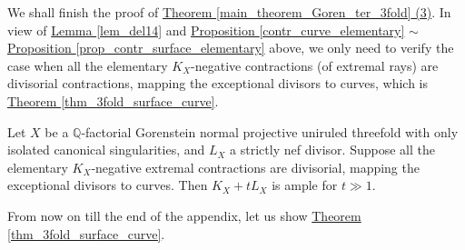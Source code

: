\begin{rmq}\label{remark_conclude_excep_tocurve}
We shall finish the proof of  {\hyperref[main_theorem_Goren_ter_3fold]{Theorem   \ref*{main_theorem_Goren_ter_3fold} (3)}}.  %
In view of {\hyperref[lem_del14]{Lemma  \ref*{lem_del14}}} and {\hyperref[contr_curve_elementary]{Proposition   \ref*{contr_curve_elementary}}}  $\sim$ {\hyperref[prop_contr_surface_elementary]{Proposition   \ref*{prop_contr_surface_elementary}}}  above,  we only need to verify the case when all the elementary $K_X$-negative  contractions (of extremal rays) are divisorial contractions, mapping the exceptional divisors to curves, %
which is {\hyperref[thm_3fold_surface_curve]{Theorem \ref*{thm_3fold_surface_curve}}}.
\end{rmq}






\begin{thm}\label{thm_3fold_surface_curve}
Let  $X$ be a  $\mathbb{Q}$-factorial Gorenstein normal projective uniruled threefold with only isolated  canonical singularities, 
and $L_X$ a strictly nef divisor.
Suppose  all the elementary $K_X$-negative extremal contractions  are divisorial, mapping the exceptional divisors to curves.
Then $K_X+tL_X$ is ample for $t\gg 1$.
\end{thm}

From now on till the end of the appendix, let us show {\hyperref[thm_3fold_surface_curve]{Theorem \ref*{thm_3fold_surface_curve}}}. 




